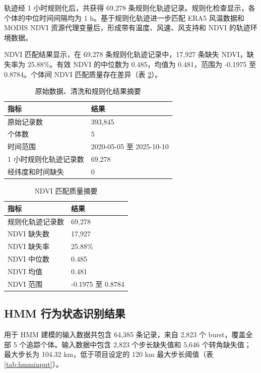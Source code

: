 \documentclass[UTF8,a4paper,12pt]{ctexart}
\begin{document}
轨迹经 1 小时规则化后，共获得 69,278 条规则化轨迹记录。规则化检查显示，各个体的中位时间间隔均为 1 h。基于规则化轨迹进一步匹配 ERA5 风温数据和 MODIS NDVI 资源代理变量后，形成带有温度、风速、风支持和 NDVI 的轨迹环境数据。

NDVI 匹配结果显示，在 69,278 条规则化轨迹记录中，17,927 条缺失 NDVI，缺失率为 25.88\%。有效 NDVI 的中位数为 0.485，均值为 0.481，范围为 -0.1975 至 0.8784。个体间 NDVI 匹配质量存在差异（表 \ref{tab:ndviqc}）。

\begin{table}[H]
  \centering
  \caption{原始数据、清洗和规则化结果摘要}
  \label{tab:preprocess}
  \begin{tabular}{ll}
    \toprule
    指标 & 结果 \\
    \midrule
    原始记录数 & 393,845 \\
    个体数 & 5 \\
    时间范围 & 2020-05-05 至 2025-10-10 \\
    1 小时规则化轨迹记录数 & 69,278 \\
    经纬度和时间缺失 & 0 \\
    \bottomrule
  \end{tabular}
\end{table}

\begin{table}[H]
  \centering
  \caption{NDVI 匹配质量摘要}
  \label{tab:ndviqc}
  \begin{tabular}{ll}
    \toprule
    指标 & 结果 \\
    \midrule
    规则化轨迹记录数 & 69,278 \\
    NDVI 缺失数 & 17,927 \\
    NDVI 缺失率 & 25.88\% \\
    NDVI 中位数 & 0.485 \\
    NDVI 均值 & 0.481 \\
    NDVI 范围 & -0.1975 至 0.8784 \\
    \bottomrule
  \end{tabular}
\end{table}

\subsection{HMM 行为状态识别结果}

用于 HMM 建模的输入数据共包含 64,385 条记录，来自 2,823 个 burst，覆盖全部 5 个追踪个体。输入数据中包含 2,823 个步长缺失值和 5,646 个转角缺失值；最大步长为 104.32 km，低于项目设定的 120 km 最大步长阈值（表 \ref{tab:hmminput}）。
\end{document}
